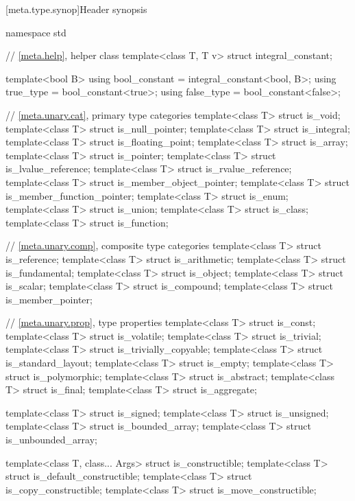 [meta.type.synop]{Header  synopsis}

%
\begin{codeblock}
namespace std {
  // \ref{meta.help}, helper class
  template<class T, T v> struct integral_constant;

  template<bool B>
    using bool_constant = integral_constant<bool, B>;
  using true_type  = bool_constant<true>;
  using false_type = bool_constant<false>;

  // \ref{meta.unary.cat}, primary type categories
  template<class T> struct is_void;
  template<class T> struct is_null_pointer;
  template<class T> struct is_integral;
  template<class T> struct is_floating_point;
  template<class T> struct is_array;
  template<class T> struct is_pointer;
  template<class T> struct is_lvalue_reference;
  template<class T> struct is_rvalue_reference;
  template<class T> struct is_member_object_pointer;
  template<class T> struct is_member_function_pointer;
  template<class T> struct is_enum;
  template<class T> struct is_union;
  template<class T> struct is_class;
  template<class T> struct is_function;

  // \ref{meta.unary.comp}, composite type categories
  template<class T> struct is_reference;
  template<class T> struct is_arithmetic;
  template<class T> struct is_fundamental;
  template<class T> struct is_object;
  template<class T> struct is_scalar;
  template<class T> struct is_compound;
  template<class T> struct is_member_pointer;

  // \ref{meta.unary.prop}, type properties
  template<class T> struct is_const;
  template<class T> struct is_volatile;
  template<class T> struct is_trivial;
  template<class T> struct is_trivially_copyable;
  template<class T> struct is_standard_layout;
  template<class T> struct is_empty;
  template<class T> struct is_polymorphic;
  template<class T> struct is_abstract;
  template<class T> struct is_final;
  template<class T> struct is_aggregate;

  template<class T> struct is_signed;
  template<class T> struct is_unsigned;
  template<class T> struct is_bounded_array;
  template<class T> struct is_unbounded_array;

  template<class T, class... Args> struct is_constructible;
  template<class T> struct is_default_constructible;
  template<class T> struct is_copy_constructible;
  template<class T> struct is_move_constructible;

}
\end{codeblock}
